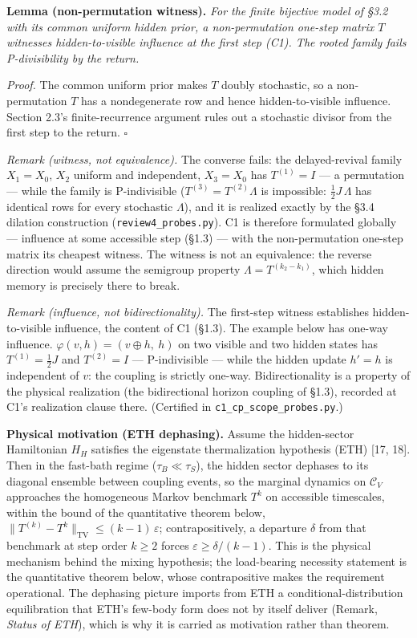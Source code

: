 \documentclass[
]{article}
\begin{document}
\textbf{Lemma (non-permutation witness).} \emph{For the finite bijective
model of §3.2 with its common uniform hidden prior, a non-permutation
one-step matrix \(T\) witnesses hidden-to-visible influence at the first
step (C1). The rooted family fails P-divisibility by the return.}

\emph{Proof.} The common uniform prior makes \(T\) doubly stochastic, so
a non-permutation \(T\) has a nondegenerate row and hence
hidden-to-visible influence. Section 2.3's finite-recurrence argument
rules out a stochastic divisor from the first step to the return.
\(\square\)

\emph{Remark (witness, not equivalence).} The converse fails: the
delayed-revival family \(X_1 = X_0\), \(X_2\) uniform and independent,
\(X_3 = X_0\) has \(T^{(1)} = I\) --- a permutation --- while the family
is P-indivisible (\(T^{(3)} = T^{(2)}\Lambda\) is impossible:
\(\tfrac{1}{2}J\,\Lambda\) has identical rows for every stochastic
\(\Lambda\)), and it is realized exactly by the §3.4 dilation
construction (\texttt{review4\_probes.py}). C1 is therefore formulated
globally --- influence at some accessible step (§1.3) --- with the
non-permutation one-step matrix its cheapest witness. The witness is not
an equivalence: the reverse direction would assume the semigroup
property \(\Lambda = T^{(k_2 - k_1)}\), which hidden memory is precisely
there to break.

\emph{Remark (influence, not bidirectionality).} The first-step witness
establishes hidden-to-visible influence, the content of C1 (§1.3). The
example below has one-way influence.
\(\varphi(v, h) = (v \oplus h,\ h)\) on two visible and two hidden
states has \(T^{(1)} = \tfrac{1}{2}J\) and \(T^{(2)} = I\) ---
P-indivisible --- while the hidden update \(h' = h\) is independent of
\(v\): the coupling is strictly one-way. Bidirectionality is a property
of the physical realization (the bidirectional horizon coupling of
§1.3), recorded at C1's realization clause there. (Certified in
\texttt{c1\_cp\_scope\_probes.py}.)

\textbf{Physical motivation (ETH dephasing).} Assume the hidden-sector
Hamiltonian \(H_H\) satisfies the eigenstate thermalization hypothesis
(ETH) {[}17, 18{]}. Then in the fast-bath regime
(\(\tau_B \ll \tau_S\)), the hidden sector dephases to its diagonal
ensemble between coupling events, so the marginal dynamics on
\(\mathcal{C}_V\) approaches the homogeneous Markov benchmark \(T^k\) on
accessible timescales, within the bound of the quantitative theorem
below, \(\|T^{(k)} - T^k\|_{\mathrm{TV}} \leq (k-1)\,\varepsilon\);
contrapositively, a departure \(\delta\) from that benchmark at step
order \(k \geq 2\) forces \(\varepsilon \geq \delta/(k-1)\). This is the
physical mechanism behind the mixing hypothesis; the load-bearing
necessity statement is the quantitative theorem below, whose
contrapositive makes the requirement operational. The dephasing picture
imports from ETH a conditional-distribution equilibration that ETH's
few-body form does not by itself deliver (Remark, \emph{Status of ETH}),
which is why it is carried as motivation rather than theorem.
\end{document}
